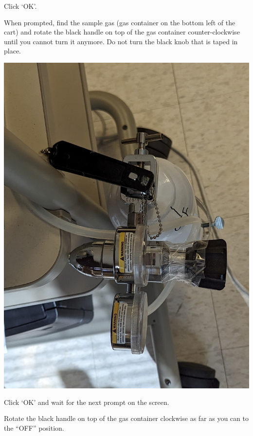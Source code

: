\documentclass[
]{book}
\begin{document}
Click `OK'.

When prompted, find the sample gas (gas container on the bottom left of the cart) and rotate the black handle on top of the gas container counter-clockwise until you cannot turn it anymore. Do not turn the black knob that is taped in place.

\includegraphics[width=1\linewidth]{images/parvocalibration/gas_on}

Click `OK' and wait for the next prompt on the screen.

Rotate the black handle on top of the gas container clockwise as far as you can to the ``OFF'' position.
\end{document}
